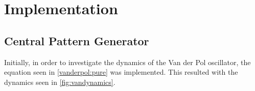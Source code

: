





\section{Implementation}
\subsection{Central Pattern Generator}



Initially, in order to investigate the dynamics of the Van der Pol oscillator,  the equation seen in \ref{vanderpol:pure} was implemented. This resulted with the dynamics seen in \ref{fig:vandynamics}. 


